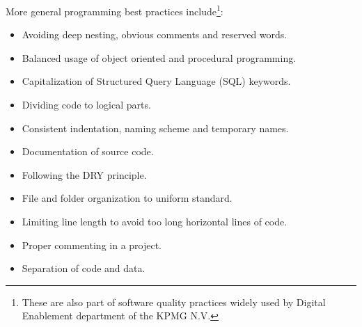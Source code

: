 \documentclass{article} %
\begin{document}
\newline
More general programming best practices \cite{bib:general_best_practices} include\footnote{These are also part of software quality practices widely used by Digital Enablement department of the KPMG N.V.}: 
\begin{itemize}
    \item Avoiding deep nesting, obvious comments and reserved words.
    \item Balanced usage of object oriented and procedural programming.
    \item Capitalization of Structured Query Language (SQL) keywords.
    \item Dividing code to logical parts.
    \item Consistent indentation, naming scheme and temporary names.
    \item Documentation of source code.
    \item Following the DRY principle.
    \item File and folder organization to uniform standard.
    \item Limiting line length to avoid too long horizontal lines of code.
    \item Proper commenting in a project.
    \item Separation of code and data.
\end{itemize}
\end{document}
